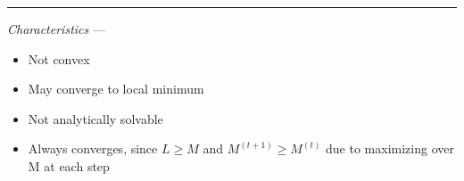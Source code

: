 {\color{lightgray}\hrule height 0.001mm}

\emph{Characteristics} --- 
\begin{itemize}
    \item Not convex
    \item May converge to local minimum
    \item Not analytically solvable
    \item Always converges, since $L \geq M$ and $M^{(t+1)} \geq M^{(t)}$ due to maximizing over M at each step
\end{itemize}